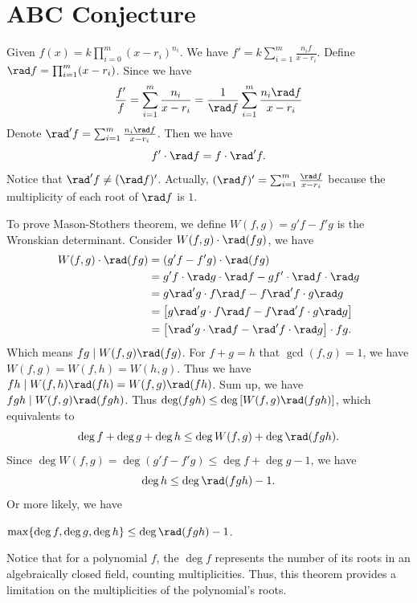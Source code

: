 \section{ABC Conjecture}\label{sec:abc-conjecture}
Given $f(x) = k\prod_{i=0}^{m}(x - r_i)^{n_i}$. We have $f' = k\sum_{i=1}^{m}\frac{n_i f}{x - r_i}$.
Define $\rad f = \prod_{i=1}^{m}(x - r_i)$. Since we have
\[ \frac{f'}{f} = \sum_{i=1}^{m}\frac{n_i}{x - r_i} = \frac{1}{\rad f}\sum_{i=1}^{m}\frac{n_i\rad f}{x - r_i} \]
Denote $\rad' f = \sum_{i=1}^{m}\frac{n_i\rad f}{x - r_i}$. Then we have
\[ f'\cdot \rad f = f\cdot \rad'f. \]
Notice that $\rad' f \ne (\rad f)'$. Actually, $(\rad f)' = \sum_{i=1}^{m}\frac{\rad f}{x - r_i}$ because the multiplicity of each root of $\rad f$ is $1$.

To prove Mason-Stothers theorem, we define $W(f, g) = g'f - f'g$ is the Wronskian determinant. Consider $W(f, g)\cdot\rad(fg)$, we have 
\begin{align*}
	W(f, g)\cdot\rad(fg) &= (g'f - f'g)\cdot\rad(fg)\\
	&= g'f\cdot\rad g\cdot\rad f - gf'\cdot\rad f\cdot\rad g \\
	&= g\rad'g\cdot f\rad f - f\rad'f\cdot g\rad g \\
	&= \left[g\rad'g\cdot f\rad f - f\rad'f\cdot g\rad g\right] \\
	&= \left[\rad'g\cdot \rad f - \rad'f\cdot \rad g\right]\cdot fg.
\end{align*}
Which means $fg \mid W(f, g)\rad(fg)$.
For $f + g = h$ that $\gcd(f, g) = 1$, we have $W(f, g) = W(f, h) = W(h, g)$. Thus we have $fh \mid W(f, h)\rad(fh) = W(f, g)\rad(fh)$.
Sum up, we have $fgh \mid W(f, g)\rad(fgh)$. Thus $\deg(fgh) \le \deg\left[W(f, g)\rad(fgh)\right]$, which equivalents to
\[ \deg f + \deg g + \deg h \le \deg W(f, g) + \deg \rad(fgh). \]
Since $\deg W(f, g) = \deg (g'f - f'g) \le \deg f + \deg g - 1$, we have
\[ \deg h \le \deg \rad(fgh) - 1. \]
Or more likely, we have
\begin{theorem}
	$\max\{ \deg f, \deg g, \deg h \} \le \deg \rad(fgh) - 1$.
\end{theorem}
Notice that for a polynomial $f$, the $\deg f$ represents the number of its roots in an algebraically closed field, counting multiplicities. Thus, this theorem provides a limitation on the multiplicities of the polynomial's roots.

